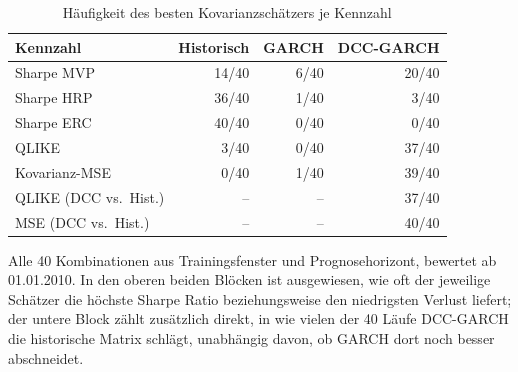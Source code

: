 \begin{table}[htbp]
  \centering
  \footnotesize
  \begin{tabular}{lrrr}
    \toprule
    Kennzahl & Historisch & GARCH & DCC-GARCH \\
    \midrule
    Sharpe MVP & 14/40 & 6/40 & 20/40 \\
    Sharpe HRP & 36/40 & 1/40 & 3/40 \\
    Sharpe ERC & 40/40 & 0/40 & 0/40 \\
    \midrule
    QLIKE & 3/40 & 0/40 & 37/40 \\
    Kovarianz-MSE & 0/40 & 1/40 & 39/40 \\
    \midrule
    QLIKE (DCC vs.\ Hist.) & -- & -- & 37/40 \\
    MSE (DCC vs.\ Hist.) & -- & -- & 40/40 \\
    \bottomrule
  \end{tabular}
  \caption{Häufigkeit des besten Kovarianzschätzers je Kennzahl}
  \label{tab:bestzaehlung}
  \begin{minipage}{\linewidth}\vspace{0.4em}\centering\footnotesize
  Alle 40 Kombinationen aus Trainingsfenster und Prognosehorizont, bewertet ab 01.01.2010. In den oberen beiden Blöcken ist ausgewiesen, wie oft der jeweilige Schätzer die höchste Sharpe Ratio beziehungsweise den niedrigsten Verlust liefert; der untere Block zählt zusätzlich direkt, in wie vielen der 40 Läufe DCC-GARCH die historische Matrix schlägt, unabhängig davon, ob GARCH dort noch besser abschneidet.
  \end{minipage}
\end{table}
